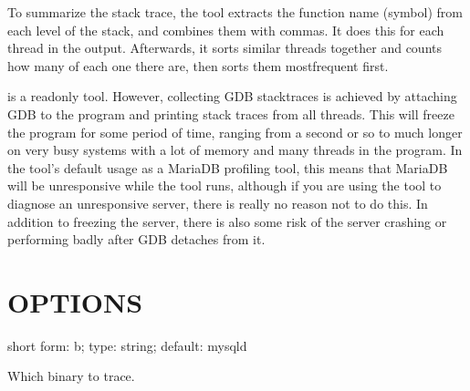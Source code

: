 \documentclass[letterpaper,10pt,english]{sphinxmanual}
\begin{document}
\sphinxAtStartPar
To summarize the stack trace, the tool extracts the function name (symbol)
from each level of the stack, and combines them with commas.  It does this
for each thread in the output.  Afterwards, it sorts similar threads together
and counts how many of each one there are, then sorts them most\sphinxhyphen{}frequent first.

\sphinxAtStartPar
{} is a read\sphinxhyphen{}only tool.  However, collecting GDB stacktraces is achieved by
attaching GDB to the program and printing stack traces from all threads. This
will freeze the program for some period of time, ranging from a second or so to
much longer on very busy systems with a lot of memory and many threads in the
program.  In the tool’s default usage as a MariaDB profiling tool, this means that
MariaDB will be unresponsive while the tool runs, although if you are using the
tool to diagnose an unresponsive server, there is really no reason not to do
this.  In addition to freezing the server, there is also some risk of the server
crashing or performing badly after GDB detaches from it.


\section{OPTIONS}
\label{\detokenize{mariadb-stacktrace:options}}

\begin{fulllineitems}
\label{\detokenize{mariadb-stacktrace:cmdoption-mariadb-stacktrace-binary}}
\sphinxAtStartPar
short form: \sphinxhyphen{}b; type: string; default: mysqld

\sphinxAtStartPar
Which binary to trace.

\end{fulllineitems}

\end{document}
